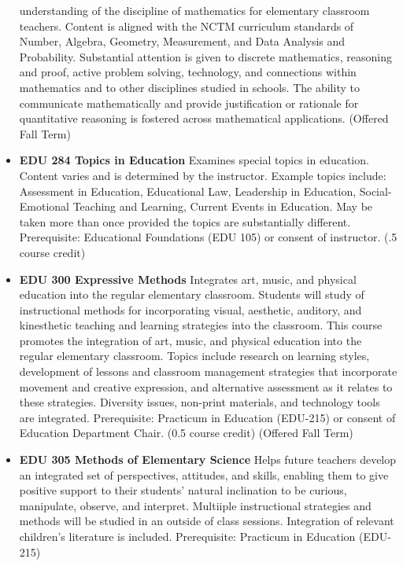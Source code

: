 \documentclass[
  letterpaper,
]{scrbook}
\begin{document}
\begin{itemize}
  understanding of the discipline of mathematics for elementary
  classroom teachers. Content is aligned with the NCTM curriculum
  standards of Number, Algebra, Geometry, Measurement, and Data Analysis
  and Probability. Substantial attention is given to discrete
  mathematics, reasoning and proof, active problem solving, technology,
  and connections within mathematics and to other disciplines studied in
  schools. The ability to communicate mathematically and provide
  justification or rationale for quantitative reasoning is fostered
  across mathematical applications. (Offered Fall Term)\\
\item
  \textbf{EDU 284 Topics in Education} Examines special topics in
  education. Content varies and is determined by the instructor. Example
  topics include: Assessment in Education, Educational Law, Leadership
  in Education, Social-Emotional Teaching and Learning, Current Events
  in Education. May be taken more than once provided the topics are
  substantially different. Prerequisite: Educational Foundations (EDU
  105) or consent of instructor. (.5 course credit)\\
\item
  \textbf{EDU 300 Expressive Methods} Integrates art, music, and
  physical education into the regular elementary classroom. Students
  will study of instructional methods for incorporating visual,
  aesthetic, auditory, and kinesthetic teaching and learning strategies
  into the classroom. This course promotes the integration of art,
  music, and physical education into the regular elementary classroom.
  Topics include research on learning styles, development of lessons and
  classroom management strategies that incorporate movement and creative
  expression, and alternative assessment as it relates to these
  strategies. Diversity issues, non-print materials, and technology
  tools are integrated. Prerequisite: Practicum in Education (EDU-215)
  or consent of Education Department Chair. (0.5 course credit) (Offered
  Fall Term)\\
\item
  \textbf{EDU 305 Methods of Elementary Science} Helps future teachers
  develop an integrated set of perspectives, attitudes, and skills,
  enabling them to give positive support to their students' natural
  inclination to be curious, manipulate, observe, and interpret.
  Multiiple instructional strategies and methods will be studied in an
  outside of class sessions. Integration of relevant children's
  literature is included. Prerequisite: Practicum in Education (EDU-215)

\end{itemize}
\end{document}
